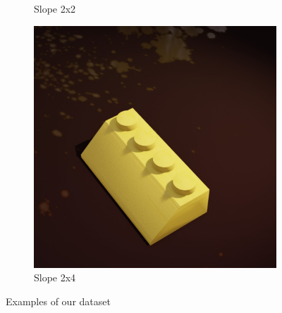 \documentclass[]{article}
\begin{document}
\begin{figure}[h]
\begin{subfigure}[b]{0.15\textwidth}
        \caption{Slope 2x2}\par\medskip
    \end{subfigure}
    \begin{subfigure}[b]{0.15\textwidth}
        \centering
        \includegraphics[width=\textwidth]{Examples/slope-2x4.jpg}
        \caption{Slope 2x4}\par\medskip
    \end{subfigure}
    \caption{Examples of our dataset}
\end{figure}
\end{document}
